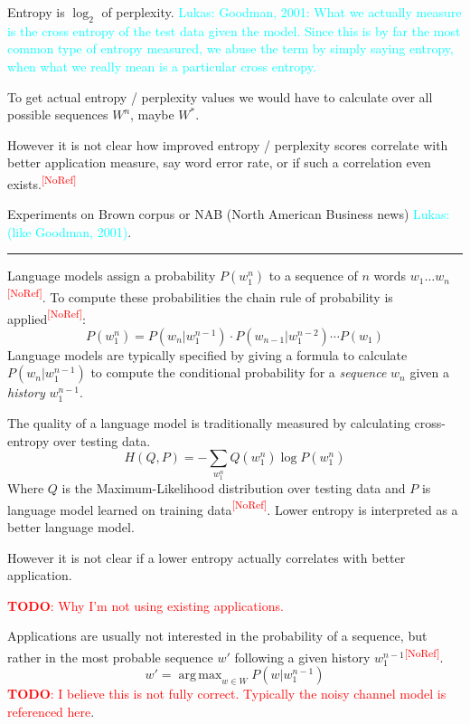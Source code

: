 \documentclass[11pt,a4paper]{article}
\newcommand{\todo}[1]{\textcolor{red}{\textbf{TODO}: #1}}
\newcommand{\lukas}[1]{\textcolor{cyan}{Lukas: #1}}
\newcommand{\noref}{\textcolor{red}{\small \textsuperscript{[NoRef]}}}
\DeclareMathOperator*{\argmax}{arg\,max}
\begin{document}
Entropy is $\log_2$ of perplexity. \lukas{Goodman, 2001: What we actually
measure is the cross entropy of the test data given the model. Since this is by
far the most common type of entropy measured, we abuse the term by simply saying
entropy, when what we really mean is a particular cross entropy.}

To get actual entropy / perplexity values we would have to calculate over all
possible sequences $W^n$, maybe $W^*$.

However it is not clear how improved entropy / perplexity scores correlate with
better application measure, say word error rate, or if such a correlation even
exists.\noref

Experiments on Brown corpus or NAB (North American Business news)
\lukas{(like Goodman, 2001)}.

\vspace{1em}
\hrule

Language models assign a probability $P(w_1^n)$ to a sequence of $n$
words $w_1 \ldots w_n$\noref.
To compute these probabilities the chain rule of probability is applied\noref:
\begin{equation}
  P(w_1^n) = P(w_n | w_1^{n-1}) \cdot P(w_{n-1} | w_1^{n-2}) \cdots P(w_1)
\end{equation}
Language models are typically specified by giving a formula to calculate
$P(w_n | w_1^{n-1})$ to compute the conditional probability for a
\emph{sequence} $w_n$ given a \emph{history} $w_1^{n-1}$.

The quality of a language model is traditionally measured by calculating
cross-entropy over testing data.
\begin{equation}
  H(Q,P) = - \sum_{w_1^n} Q(w_1^n) \log P(w_1^n)
\end{equation}
Where $Q$ is the Maximum-Likelihood distribution over testing data and $P$ is
language model learned on training data\noref.
Lower entropy is interpreted as a better language model.

However it is not clear if a lower entropy actually correlates with better
application.

\todo{Why I'm not using existing applications.}

Applications are usually not interested in the probability of a sequence, but
rather in the most probable sequence $w'$ following a given history
$w_1^{n-1}$\noref.
\begin{equation}
  w' = \argmax_{w \in W} P(w | w_1^{n-1})
\end{equation}
\todo{I believe this is not fully correct. Typically the noisy channel model is
referenced here}.
\end{document}
